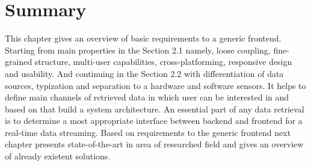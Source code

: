 \section{Summary}
	This chapter gives an overview of basic requirements to a generic frontend. Starting from main properties in the Section 2.1 namely, loose coupling, fine-grained structure, multi-user capabilities, cross-platforming, responsive design and usability. And continuing in the Section 2.2 with differentiation of data sources, typization and separation to a hardware and software sensors. It helps to define main channels of retrieved data in which user can be interested in and based on that build a system architecture. An essential part of any data retrieval is to determine a most appropriate interface between backend and frontend for a real-time data streaming. Based on requirements to the generic frontend next chapter presents state-of-the-art in area of researched field and gives an overview of already existent solutions.
